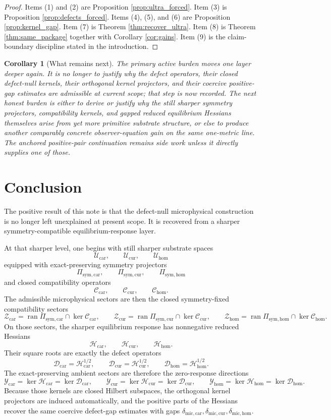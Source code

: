 \documentclass[11pt]{article}
\newcommand{\ProtoTensorClass}{\mathscr Y_{\mathrm{car}}}
\newcommand{\ProtoRelabelClass}{\mathscr Y_{\mathrm{cur}}}
\newcommand{\ProtoFreeClass}{\mathscr Y_{\mathrm{hom}}}
\newcommand{\UltraTensorClass}{\mathscr Z_{\mathrm{car}}}
\newcommand{\UltraRelabelClass}{\mathscr Z_{\mathrm{cur}}}
\newcommand{\UltraFreeClass}{\mathscr Z_{\mathrm{hom}}}
\newcommand{\UltraCarGap}{\delta_{\mathrm{mic,car}}}
\newcommand{\UltraCurGap}{\delta_{\mathrm{mic,cur}}}
\newcommand{\UltraHomGap}{\delta_{\mathrm{mic,hom}}}
\newcommand{\TensorDefect}{\mathcal D_{\mathrm{car}}}
\newcommand{\CurDefect}{\mathcal D_{\mathrm{cur}}}
\newcommand{\HomDefect}{\mathcal D_{\mathrm{hom}}}
\newcommand{\RootTensorClass}{\mathscr U_{\mathrm{car}}}
\newcommand{\RootRelabelClass}{\mathscr U_{\mathrm{cur}}}
\newcommand{\RootFreeClass}{\mathscr U_{\mathrm{hom}}}
\newcommand{\TensorSymProj}{\Pi_{\mathrm{sym,car}}}
\newcommand{\CurSymProj}{\Pi_{\mathrm{sym,cur}}}
\newcommand{\HomSymProj}{\Pi_{\mathrm{sym,hom}}}
\newcommand{\TensorCompat}{\mathcal C_{\mathrm{car}}}
\newcommand{\CurCompat}{\mathcal C_{\mathrm{cur}}}
\newcommand{\HomCompat}{\mathcal C_{\mathrm{hom}}}
\newcommand{\TensorHess}{\mathcal H_{\mathrm{car}}}
\newcommand{\CurHess}{\mathcal H_{\mathrm{cur}}}
\newcommand{\HomHess}{\mathcal H_{\mathrm{hom}}}
\newtheorem{corollary}{Corollary}
\begin{document}
\begin{proof}
Items (1) and (2) are Proposition \ref{prop:ultra_forced}. Item (3) is Proposition \ref{prop:defects_forced}. Items (4), (5), and (6) are Proposition \ref{prop:kernel_gap}. Item (7) is Theorem \ref{thm:recover_ultra}. Item (8) is Theorem \ref{thm:same_package} together with Corollary \ref{cor:gains}. Item (9) is the claim-boundary discipline stated in the introduction.
\end{proof}

\begin{corollary}[What remains next]
The primary active burden moves one layer deeper again. It is no longer to justify why the defect operators, their closed defect-null kernels, their orthogonal kernel projectors, and their coercive positive-gap estimates are admissible at current scope; that step is now recorded. The next honest burden is either to derive or justify why the still sharper symmetry projectors, compatibility kernels, and gapped reduced equilibrium Hessians themselves arise from yet more primitive substrate structure, or else to produce another comparably concrete observer-equation gain on the same one-metric line. The anchored positive-pair continuation remains side work unless it directly supplies one of those.
\end{corollary}

\section{Conclusion}

The positive result of this note is that the defect-null microphysical construction is no longer left unexplained at present scope. It is recovered from a sharper symmetry-compatible equilibrium-response layer.

At that sharper level, one begins with still sharper substrate spaces
\[
\RootTensorClass,\qquad
\RootRelabelClass,\qquad
\RootFreeClass
\]
equipped with exact-preserving symmetry projectors
\[
\TensorSymProj,\qquad
\CurSymProj,\qquad
\HomSymProj
\]
and closed compatibility operators
\[
\TensorCompat,\qquad
\CurCompat,\qquad
\HomCompat.
\]
The admissible microphysical sectors are then the closed symmetry-fixed compatibility sectors
\[
\UltraTensorClass=\operatorname{ran}\TensorSymProj\cap\ker\TensorCompat,
\qquad
\UltraRelabelClass=\operatorname{ran}\CurSymProj\cap\ker\CurCompat,
\qquad
\UltraFreeClass=\operatorname{ran}\HomSymProj\cap\ker\HomCompat.
\]
On those sectors, the sharper equilibrium response has nonnegative reduced Hessians
\[
\TensorHess,\qquad
\CurHess,\qquad
\HomHess.
\]
Their square roots are exactly the defect operators
\[
\TensorDefect=\TensorHess^{1/2},
\qquad
\CurDefect=\CurHess^{1/2},
\qquad
\HomDefect=\HomHess^{1/2}.
\]
The exact-preserving ambient sectors are therefore the zero-response directions
\[
\ProtoTensorClass=\ker\TensorHess=\ker\TensorDefect,
\qquad
\ProtoRelabelClass=\ker\CurHess=\ker\CurDefect,
\qquad
\ProtoFreeClass=\ker\HomHess=\ker\HomDefect.
\]
Because those kernels are closed Hilbert subspaces, the orthogonal kernel projectors are induced automatically, and the positive parts of the Hessians recover the same coercive defect-gap estimates with gaps \(\UltraCarGap,\UltraCurGap,\UltraHomGap\).
\end{document}
